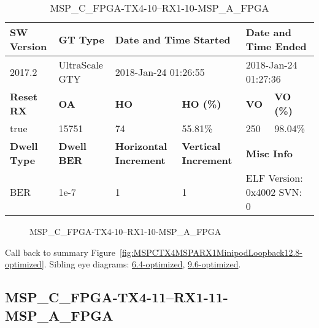 \begin{table}[h]
\centering
\caption{MSP\_C\_FPGA-TX4-10--RX1-10-MSP\_A\_FPGA}
\label{tab:MSPCFPGATX410RX110MSPAFPGA12.8-optimized}
\begin{tabular}{@{}|l|l|l|l|l|l|@{}}
\toprule
\textbf{SW Version}                & \textbf{GT Type}   & \multicolumn{2}{l|}{\textbf{Date and Time Started}}            & \multicolumn{2}{l|}{\textbf{Date and Time Ended}}        \\ \midrule
2017.2                       & UltraScale GTY          & \multicolumn{2}{l|}{2018-Jan-24 01:26:55}                   & \multicolumn{2}{l|}{2018-Jan-24 01:27:36}               \\ \midrule
\textbf{Reset RX}                  & \textbf{OA} & \textbf{HO}   & \textbf{HO (\%)} & \textbf{VO} & \textbf{VO (\%)} \\ \midrule
true & 15751        & 74          & 55.81\%        & 250        & 98.04\%       \\ \midrule
\textbf{Dwell Type}                & \textbf{Dwell BER} & \textbf{Horizontal Increment} & \textbf{Vertical Increment}    & \multicolumn{2}{l|}{\textbf{Misc Info}}                  \\ \midrule
BER                            & 1e-7        & 1        & 1           & \multicolumn{2}{l|}{ELF Version: 0x4002 SVN: 0}                         \\ \bottomrule
\end{tabular}
\end{table}

\begin{figure}[h]
\caption{MSP\_C\_FPGA-TX4-10--RX1-10-MSP\_A\_FPGA} \label{fig:MSPCFPGATX410RX110MSPAFPGA12.8-optimized}
\end{figure}

Call back to summary Figure~\ref{fig:MSPCTX4MSPARX1MinipodLoopback12.8-optimized}.
Sibling eye diagrams: \hyperref[sec:MSPCFPGATX410RX110MSPAFPGA6.4-optimized]{6.4-optimized}, \hyperref[sec:MSPCFPGATX410RX110MSPAFPGA9.6-optimized]{9.6-optimized}.

\clearpage
\newpage


\subsection{MSP\_C\_FPGA-TX4-11--RX1-11-MSP\_A\_FPGA}\label{sec:MSPCFPGATX411RX111MSPAFPGA12.8-optimized}

